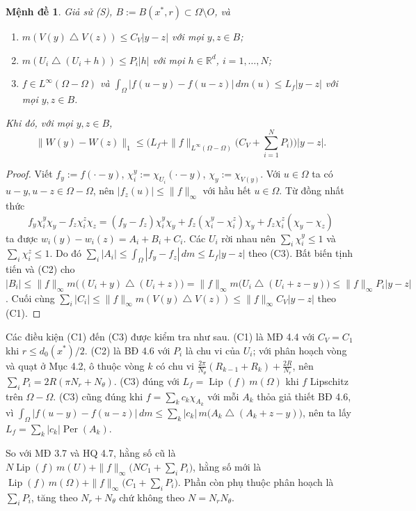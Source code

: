 \documentclass[12pt,a4paper]{article}
\theoremstyle{plain}
\newtheorem{md}[kq]{Mệnh đề}
\theoremstyle{definition}
\newcommand{\R}{\mathbb{R}}
\newcommand{\Lip}{\operatorname{Lip}}
\newcommand{\Per}{\operatorname{Per}}
\newcommand{\sd}{\mathbin{\triangle}}
\newcommand{\dm}{\,dm}
\begin{document}
\begin{md}\label{md:C}
Giả sử (S), $B:=B(x^*,r)\subset\Omega\setminus O$, và
\begin{enumerate}[label=(C\arabic*)]
\item $m(V(y)\sd V(z))\le C_V|y-z|$ với mọi $y,z\in B$;
\item $m(U_i\sd(U_i+h))\le P_i|h|$ với mọi $h\in\R^d$, $i=1,\dots,N$;
\item $f\in L^\infty(\Omega-\Omega)$ và $\int_\Omega|f(u-y)-f(u-z)|\dm(u)\le L_f|y-z|$ với mọi $y,z\in B$.
\end{enumerate}
Khi đó, với mọi $y,z\in B$,
\[
\|W(y)-W(z)\|_1\le\Big(L_f+\|f\|_{L^\infty(\Omega-\Omega)}\big(C_V+\textstyle\sum_{i=1}^NP_i\big)\Big)|y-z| .
\]
\end{md}
\begin{proof}
Viết $f_y:=f(\cdot-y)$, $\chi^y_i:=\chi_{U_i}(\cdot-y)$, $\chi_y:=\chi_{V(y)}$. Với $u\in\Omega$ ta có $u-y,u-z\in\Omega-\Omega$, nên $|f_z(u)|\le\|f\|_\infty$ với hầu hết $u\in\Omega$. Từ đồng nhất thức
\[
f_y\chi^y_i\chi_y-f_z\chi^z_i\chi_z=(f_y-f_z)\chi^y_i\chi_y+f_z(\chi^y_i-\chi^z_i)\chi_y+f_z\chi^z_i(\chi_y-\chi_z)
\]
ta được $w_i(y)-w_i(z)=A_i+B_i+C_i$. Các $U_i$ rời nhau nên $\sum_i\chi^y_i\le1$ và $\sum_i\chi^z_i\le1$. Do đó $\sum_i|A_i|\le\int_\Omega|f_y-f_z|\dm\le L_f|y-z|$ theo (C3). Bất biến tịnh tiến và (C2) cho $|B_i|\le\|f\|_\infty m\big((U_i+y)\sd(U_i+z)\big)=\|f\|_\infty m\big(U_i\sd(U_i+z-y)\big)\le\|f\|_\infty P_i|y-z|$. Cuối cùng $\sum_i|C_i|\le\|f\|_\infty m(V(y)\sd V(z))\le\|f\|_\infty C_V|y-z|$ theo (C1).
\end{proof}

Các điều kiện (C1) đến (C3) được kiểm tra như sau. (C1) là MĐ 4.4 với $C_V=C_1$ khi $r\le d_0(x^*)/2$. (C2) là BĐ 4.6 với $P_i$ là chu vi của $U_i$; với phân hoạch vòng và quạt ở Mục 4.2, ô thuộc vòng $k$ có chu vi $\frac{2\pi}{N_\theta}(R_{k-1}+R_k)+\frac{2R}{N_r}$, nên $\sum_iP_i=2R(\pi N_r+N_\theta)$. (C3) đúng với $L_f=\Lip(f)\,m(\Omega)$ khi $f$ Lipschitz trên $\Omega-\Omega$. (C3) cũng đúng khi $f=\sum_kc_k\chi_{A_k}$ với mỗi $A_k$ thỏa giả thiết BĐ 4.6, vì $\int_\Omega|f(u-y)-f(u-z)|\dm\le\sum_k|c_k|\,m\big(A_k\sd(A_k+z-y)\big)$, nên ta lấy $L_f=\sum_k|c_k|\Per(A_k)$.

So với MĐ 3.7 và HQ 4.7, hằng số cũ là $N\Lip(f)\,m(U)+\|f\|_\infty\big(NC_1+\sum_iP_i\big)$, hằng số mới là $\Lip(f)\,m(\Omega)+\|f\|_\infty\big(C_1+\sum_iP_i\big)$. Phần còn phụ thuộc phân hoạch là $\sum_iP_i$, tăng theo $N_r+N_\theta$ chứ không theo $N=N_rN_\theta$.
\end{document}

